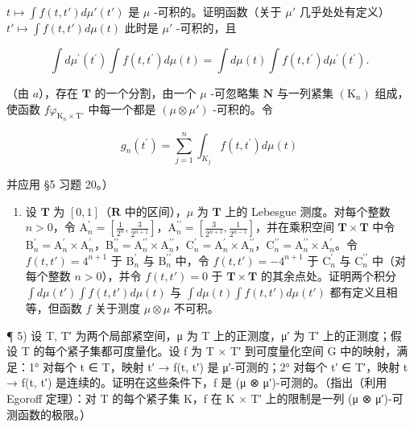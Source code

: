 \(t \mapsto \int f(t, t') d\mu'(t')\) 是 \(\mu\) -可积的。证明函数（关于 \(\mu'\) 几乎处处有定义）\(t' \mapsto \int f(t, t') d\mu(t)\) 此时是 \(\mu'\) -可积的，且

\[
\int d \mu^ {\prime} (t ^ {\prime}) \int f (t, t ^ {\prime}) d \mu (t) = \int d \mu (t) \int f (t, t ^ {\prime}) d \mu^ {\prime} (t ^ {\prime}).
\]

（由 \(a\)），存在 \(\mathbf{T}\) 的一个分割，由一个 \(\mu\) -可忽略集 \(\mathbf{N}\) 与一列紧集 \((\mathrm{K}_n)\) 组成，使函数 \(f\varphi_{\mathrm{K}_n\times \mathrm{T}'}\) 中每一个都是 \((\mu \otimes \mu')\) -可积的。令

\[
g _ {n} (t ^ {\prime}) = \sum_ {j = 1} ^ {n} \int_ {K _ {j}} f (t, t ^ {\prime}) d \mu (t)
\]

并应用 §5 习题 20。）

\begin{enumerate}
\def\labelenumi{\alph{enumi})}
\setcounter{enumi}{2}
\tightlist
\item
  设 \(\mathbf{T}\) 为 \([0,1]\)（\(\mathbf{R}\) 中的区间），\(\mu\) 为 \(\mathbf{T}\) 上的 Lebesgue 测度。对每个整数 \(n > 0\)，令 \(\mathrm{A}_n^\prime = \left[\frac{1}{2^n}, \frac{3}{2^{n+1}}\right]\)，\(\mathrm{A}_n^{\prime\prime} = \left[\frac{3}{2^{n+1}}, \frac{1}{2^{n-1}}\right]\)，并在乘积空间 \(\mathbf{T} \times \mathbf{T}\) 中令 \(\mathrm{B}_n^\prime = \mathrm{A}_n^\prime \times \mathrm{A}_n^\prime\)，\(\mathrm{B}_n^{\prime\prime} = \mathrm{A}_n^{\prime\prime} \times \mathrm{A}_n^{\prime\prime}\)，\(\mathrm{C}_n^\prime = \mathrm{A}_n^\prime \times \mathrm{A}_n^{\prime\prime}\)，\(\mathrm{C}_n^{\prime\prime} = \mathrm{A}_n^{\prime\prime} \times \mathrm{A}_n^\prime\)。令 \(f(t,t') = 4^{n+1}\) 于 \(\mathrm{B}_n^\prime\) 与 \(\mathrm{B}_n^{\prime\prime}\) 中，令 \(f(t,t') = -4^{n+1}\) 于 \(\mathrm{C}_n^\prime\) 与 \(\mathrm{C}_n^{\prime\prime}\) 中（对每个整数 \(n > 0\)），并令 \(f(t,t') = 0\) 于 \(\mathbf{T} \times \mathbf{T}\) 的其余点处。证明两个积分 \(\int d\mu(t') \int f(t,t') d\mu(t)\) 与 \(\int d\mu(t) \int f(t,t') d\mu(t')\) 都有定义且相等，但函数 \(f\) 关于测度 \(\mu \otimes \mu\) 不可积。
\end{enumerate}

¶ 5) 设 T, T′ 为两个局部紧空间，μ 为 T 上的正测度，μ′ 为 T′ 上的正测度；假设 T 的每个紧子集都可度量化。设 f 为 T × T′ 到可度量化空间 G 中的映射，满足：1° 对每个 t ∈ T，映射 t′ → f(t, t′) 是 μ′-可测的；2° 对每个 t′ ∈ T′，映射 t → f(t, t′) 是连续的。证明在这些条件下，f 是 (μ ⊗ μ′)-可测的。（指出（利用 Egoroff 定理）：对 T 的每个紧子集 K，f 在 K × T′ 上的限制是一列 (μ ⊗ μ′)-可测函数的极限。）

